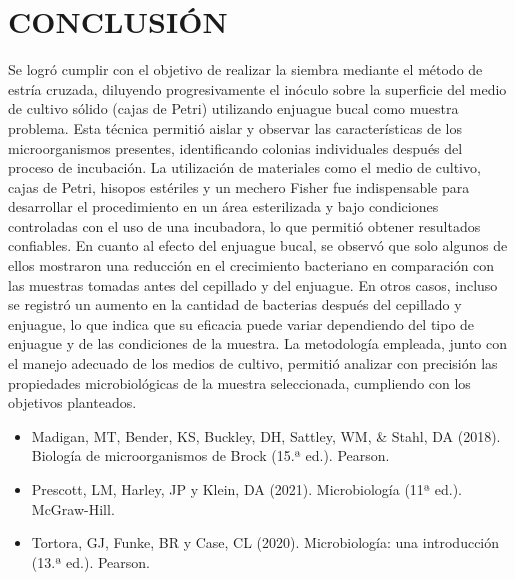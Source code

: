 \documentclass{article}
\begin{document}
\section{CONCLUSIÓN}
\noindent Se logró cumplir con el objetivo de realizar la siembra mediante el método de estría cruzada, diluyendo progresivamente el inóculo sobre la superficie del medio de cultivo sólido (cajas de Petri) utilizando enjuague bucal como muestra problema. Esta técnica permitió aislar y observar las características de los microorganismos presentes, identificando colonias individuales después del proceso de incubación. La utilización de materiales como el medio de cultivo, cajas de Petri, hisopos estériles y un mechero Fisher fue indispensable para desarrollar el procedimiento en un área esterilizada y bajo condiciones controladas con el uso de una incubadora, lo que permitió obtener resultados confiables.
En cuanto al efecto del enjuague bucal, se observó que solo algunos de ellos mostraron una reducción en el crecimiento bacteriano en comparación con las muestras tomadas antes del cepillado y del enjuague. En otros casos, incluso se registró un aumento en la cantidad de bacterias después del cepillado y enjuague, lo que indica que su eficacia puede variar dependiendo del tipo de enjuague y de las condiciones de la muestra.
La metodología empleada, junto con el manejo adecuado de los medios de cultivo, permitió analizar con precisión las propiedades microbiológicas de la muestra seleccionada, cumpliendo con los objetivos planteados.
\begin{itemize}
    \item Madigan, MT, Bender, KS, Buckley, DH, Sattley, WM, \& Stahl, DA (2018). Biología de microorganismos de Brock (15.ª ed.). Pearson. 
    \item Prescott, LM, Harley, JP y Klein, DA (2021). Microbiología (11ª ed.). McGraw-Hill. 
    \item Tortora, GJ, Funke, BR y Case, CL (2020). Microbiología: una introducción (13.ª ed.). Pearson.
\end{itemize}
\end{document}

